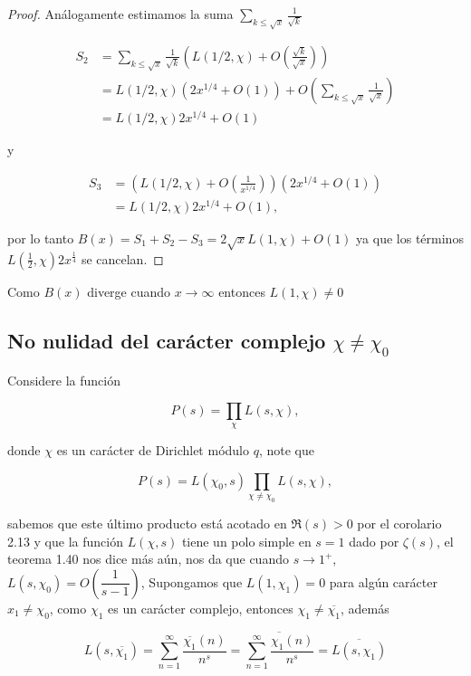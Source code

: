 \begin{proof}
Análogamente estimamos la suma $\displaystyle \sum_{k\leq \sqrt{x}} \frac{1}{\sqrt{k} }$

$$
\begin{aligned}
S_2 & =\sum_{k \leq \sqrt{x}} \frac{1}{\sqrt{k}}\left(L(1 / 2, \chi)+O\left(\frac{\sqrt{k} }{\sqrt{x}}\right)\right) \\
& =L(1 / 2, \chi)\left(2 x^{1 / 4}+O(1)\right)+O\left(\sum_{k \leq \sqrt{x}} \frac{1}{\sqrt{x}}\right) \\
& =L(1 / 2, \chi) 2 x^{1 / 4}+O(1)
\end{aligned}
$$

y


\begin{align*}
    S_3 & =\left(L(1 / 2, \chi)+O\left(\frac{1}{x^{1 / 4}}\right)\right)\left(2 x^{1 / 4}+O(1)\right) \\
& =L(1 / 2, \chi) 2 x^{1 / 4}+O(1),
\end{align*}

por lo tanto $B(x)=S_1+S_2-S_3=2 \sqrt{x}L(1,\chi)+O(1)$ ya que los términos $L(\frac{1}{2},\chi)2x^{\frac{1}{4}}$ se cancelan.

\end{proof}

Como $B(x)$ diverge cuando $x\to\infty$ entonces $L(1,\chi)\neq0$

\subsection{No nulidad del carácter complejo \texorpdfstring{$\chi\neq\chi_0$}{Lg}}

Considere la función

$$P(s)=\prod_{\chi}L(s,\chi),$$

donde $\chi$ es un carácter de Dirichlet módulo $q$, note que 

$$P(s)=L(\chi_0,s)\prod_{\chi\neq \chi_0}L(s,\chi),$$

sabemos que este último producto está acotado en $\Re(s)>0$ por el corolario 2.13 y que la función $L(\chi, s)$ tiene un polo simple en $s=1$ dado por $\zeta(s)$, el teorema 1.40 nos dice más aún, nos da que cuando $s\to 1^{+}$, $L(s,\chi_0)=O\left(\dfrac{1}{s-1}\right)$, Supongamos que $L(1,\chi_1)=0$ para algún carácter $x_1\neq\chi_0$, como $\chi_1$ es un carácter complejo, entonces $\chi_1\neq \overline{\chi_1}$, además

$$L(s,\overline{\chi_1})=\sum_{n=1}^{\infty} \frac{\overline{\chi_1}(n)}{n^s}=\overline{\sum_{n=1}^{\infty} \frac{\chi_1(n)}{n^s}}=\overline{L(s,\chi_1)}$$

